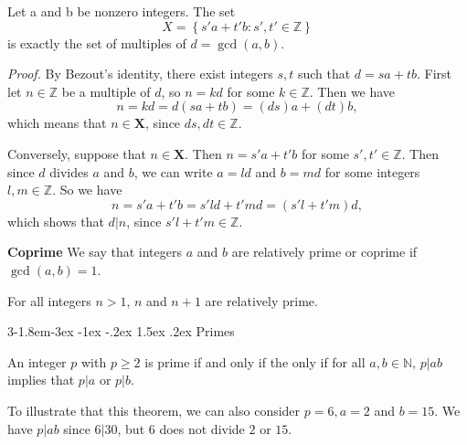 \documentclass{tufte-handout}
\makeatletter
\renewcommand{\subsection}{\@startsection{subsection}%
    {3}{-1.8em}{-3ex \@plus -1ex \@minus -.2ex}%
    {1.5ex \@plus .2ex}
    {\hspace*{-5.5em}\fcolorbox{ltblue}{ltblue}{\parbox[c][1.0ex][b]{4em}{\phantom{space}}}
    \normalfont\large\itshape\color{ltblue}}}
\makeatother
\begin{document}
\begin{Proposition}
    Let a and b be nonzero integers. The set
    \[X = \left\{s'a+t'b:s',t'\in \mathbb{Z}\right\}\]
    is exactly the set of multiples of $ d = \gcd(a,b) $.
\end{Proposition}
\textit{Proof.} By Bezout's identity, there exist integers $ s,t $ such that \( d = sa+tb \).
First let \( n \in \mathbb{Z} \) be a multiple of \( d \), so \( n = kd \) for some \( k \in \mathbb{Z} \).
Then we have \[n=kd=d(sa+tb)=(ds)a+(dt)b,\]
which means that \( n\in \mathbf{X} \), since \( ds,dt \in \mathbb{Z} \).

Conversely, suppose that \( n \in \mathbf{X} \). Then \( n = s'a+t'b \) for some \( s',t' \in \mathbb{Z} \).
Then since \( d \) divides \( a \) and \( b \), we can write \( a=ld \) and \( b=md \) for some integers \( l,m \in \mathbb{Z}\).
So we have \[n=s'a+t'b=s'ld+t'md=(s'l+t'm)d,\]
which shows that \( d|n \), since \( s'l+t'm \in \mathbb{Z} \). \qedsymbol

\textbf{Coprime} We say that integers \( a \) and \( b \) are relatively prime or coprime if \( \gcd(a,b) = 1 \).

\begin{Proposition}
    For all integers \( n>1 \), \( n \) and \( n+1 \) are relatively prime.
\end{Proposition}

\subsection{Primes}
\begin{Theorem}
    An integer \( p \) with \( p\geq 2 \) is prime if and only if the only if for
    all \( a,b \in \mathbb{N} \), \( p|ab \) implies that \( p|a \) or \( p|b \).
\end{Theorem}


To illustrate that this theorem, we can also consider \( p=6,a=2 \) and \( b=15 \).
We have \( p|ab \) since \( 6|30 \), but \( 6 \) does not divide \( 2 \) or \( 15 \).\\
\end{document}
